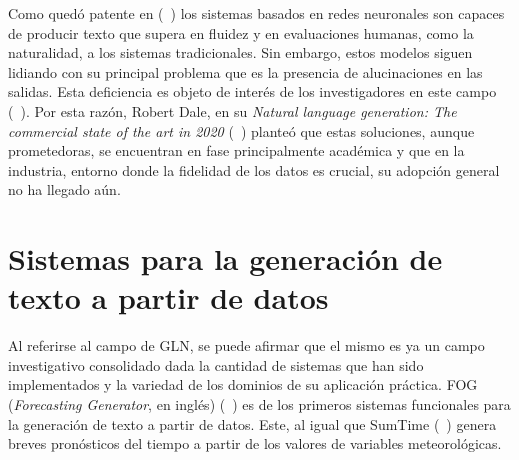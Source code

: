     Como quedó patente en (~\cite{wiseman-etal-2017-challenges,ferreira2019neural,duvsek2020evaluating,sharma2022innovations}) los sistemas basados en redes neuronales
son capaces de producir texto que supera en fluidez y en evaluaciones humanas, como la naturalidad, a los sistemas tradicionales. Sin embargo, estos modelos siguen lidiando con su principal
problema que es la presencia de alucinaciones en las salidas. Esta deficiencia es objeto de interés de los investigadores en este campo (~\cite{ji2022survey}). Por esta razón, Robert Dale, 
en su \textit{Natural language generation: The commercial state of the art in 2020} (~\cite{dale2020natural}) planteó que estas soluciones, aunque prometedoras, se 
encuentran en fase principalmente académica y que en la industria, entorno donde la fidelidad de los datos es crucial, su adopción general no ha llegado aún.   


\section{Sistemas para la generación de texto a partir de datos}

    Al referirse al campo de GLN, se puede afirmar que el mismo es ya un campo investigativo consolidado dada la cantidad 
de sistemas que han sido implementados y la variedad de los dominios de su aplicación práctica. FOG (\emph{Forecasting Generator}, en inglés) (~\cite{goldberg1994using}) es 
de los primeros sistemas funcionales para la generación de texto a partir de datos. Este, al igual que SumTime (~\cite{reiter2005choosing}) genera breves pronósticos del tiempo
a partir de los valores de variables meteorológicas. 

